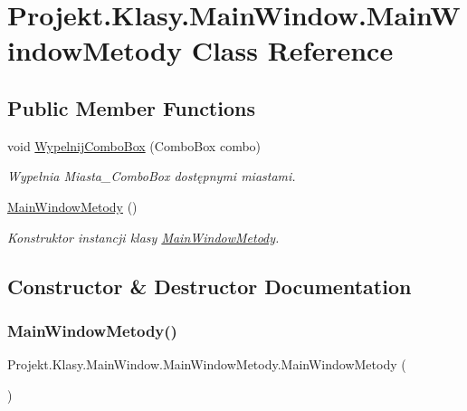 \hypertarget{class_projekt_1_1_klasy_1_1_main_window_1_1_main_window_metody}{}\section{Projekt.\+Klasy.\+Main\+Window.\+Main\+Window\+Metody Class Reference}
\label{class_projekt_1_1_klasy_1_1_main_window_1_1_main_window_metody}
\subsection*{Public Member Functions}
\begin{DoxyCompactItemize}
\item 
void \mbox{\hyperlink{class_projekt_1_1_klasy_1_1_main_window_1_1_main_window_metody_a0949895d8b695fb1ae87b383df0ee915}{Wypelnij\+Combo\+Box}} (Combo\+Box combo)
\begin{DoxyCompactList}\small\item\em Wypełnia Miasta\+\_\+\+Combo\+Box dostępnymi miastami. \end{DoxyCompactList}\item 
\mbox{\hyperlink{class_projekt_1_1_klasy_1_1_main_window_1_1_main_window_metody_a1e543a568db4164bd4780bfb99ad8be3}{Main\+Window\+Metody}} ()
\begin{DoxyCompactList}\small\item\em Konstruktor instancji klasy \mbox{\hyperlink{class_projekt_1_1_klasy_1_1_main_window_1_1_main_window_metody}{Main\+Window\+Metody}}. \end{DoxyCompactList}\end{DoxyCompactItemize}


\subsection{Constructor \& Destructor Documentation}
\mbox{\label{class_projekt_1_1_klasy_1_1_main_window_1_1_main_window_metody_a1e543a568db4164bd4780bfb99ad8be3}} 
\subsubsection{\texorpdfstring{MainWindowMetody()}{MainWindowMetody()}}
{\footnotesize\ttfamily Projekt.\+Klasy.\+Main\+Window.\+Main\+Window\+Metody.\+Main\+Window\+Metody (\begin{DoxyParamCaption}{ }\end{DoxyParamCaption})}



